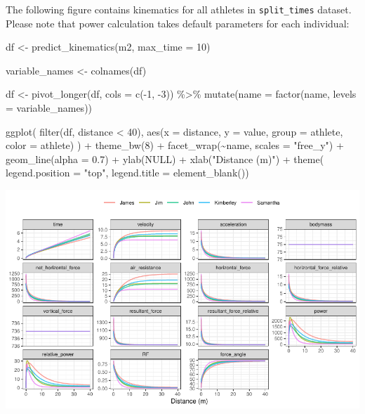 \documentclass[fleqn,10pt,lineno]{wlpeerj} %
\newenvironment{Shaded}{\begin{snugshade}}{\end{snugshade}}
\newcommand{\AttributeTok}[1]{\textcolor[rgb]{0.77,0.63,0.00}{#1}}
\newcommand{\ConstantTok}[1]{\textcolor[rgb]{0.00,0.00,0.00}{#1}}
\newcommand{\DecValTok}[1]{\textcolor[rgb]{0.00,0.00,0.81}{#1}}
\newcommand{\FloatTok}[1]{\textcolor[rgb]{0.00,0.00,0.81}{#1}}
\newcommand{\FunctionTok}[1]{\textcolor[rgb]{0.00,0.00,0.00}{#1}}
\newcommand{\NormalTok}[1]{#1}
\newcommand{\OtherTok}[1]{\textcolor[rgb]{0.56,0.35,0.01}{#1}}
\newcommand{\SpecialCharTok}[1]{\textcolor[rgb]{0.00,0.00,0.00}{#1}}
\newcommand{\StringTok}[1]{\textcolor[rgb]{0.31,0.60,0.02}{#1}}
\begin{document}
The following figure contains kinematics for all athletes in \texttt{split\_times} dataset. Please note that power calculation takes default parameters for each individual:

\begin{Shaded}
\begin{Highlighting}[]
\NormalTok{df }\OtherTok{\textless{}{-}} \FunctionTok{predict\_kinematics}\NormalTok{(m2, }\AttributeTok{max\_time =} \DecValTok{10}\NormalTok{)}

\NormalTok{variable\_names }\OtherTok{\textless{}{-}} \FunctionTok{colnames}\NormalTok{(df)}

\NormalTok{df }\OtherTok{\textless{}{-}} \FunctionTok{pivot\_longer}\NormalTok{(df, }\AttributeTok{cols =} \FunctionTok{c}\NormalTok{(}\SpecialCharTok{{-}}\DecValTok{1}\NormalTok{, }\SpecialCharTok{{-}}\DecValTok{3}\NormalTok{)) }\SpecialCharTok{\%\textgreater{}\%}
  \FunctionTok{mutate}\NormalTok{(}\AttributeTok{name =} \FunctionTok{factor}\NormalTok{(name, }\AttributeTok{levels =}\NormalTok{ variable\_names))}

\FunctionTok{ggplot}\NormalTok{(}
  \FunctionTok{filter}\NormalTok{(df, distance }\SpecialCharTok{\textless{}} \DecValTok{40}\NormalTok{),}
  \FunctionTok{aes}\NormalTok{(}\AttributeTok{x =}\NormalTok{ distance, }\AttributeTok{y =}\NormalTok{ value, }\AttributeTok{group =}\NormalTok{ athlete, }\AttributeTok{color =}\NormalTok{ athlete)}
\NormalTok{) }\SpecialCharTok{+}
  \FunctionTok{theme\_bw}\NormalTok{(}\DecValTok{8}\NormalTok{) }\SpecialCharTok{+}
  \FunctionTok{facet\_wrap}\NormalTok{(}\SpecialCharTok{\textasciitilde{}}\NormalTok{name, }\AttributeTok{scales =} \StringTok{"free\_y"}\NormalTok{) }\SpecialCharTok{+}
  \FunctionTok{geom\_line}\NormalTok{(}\AttributeTok{alpha =} \FloatTok{0.7}\NormalTok{) }\SpecialCharTok{+}
  \FunctionTok{ylab}\NormalTok{(}\ConstantTok{NULL}\NormalTok{) }\SpecialCharTok{+}
  \FunctionTok{xlab}\NormalTok{(}\StringTok{"Distance (m)"}\NormalTok{) }\SpecialCharTok{+}
  \FunctionTok{theme}\NormalTok{(}
    \AttributeTok{legend.position =} \StringTok{"top"}\NormalTok{,}
    \AttributeTok{legend.title =} \FunctionTok{element\_blank}\NormalTok{())}
\end{Highlighting}
\end{Shaded}

\begin{center}\includegraphics[width=1\linewidth]{paper_files/figure-latex/unnamed-chunk-15-1} \end{center}
\end{document}
